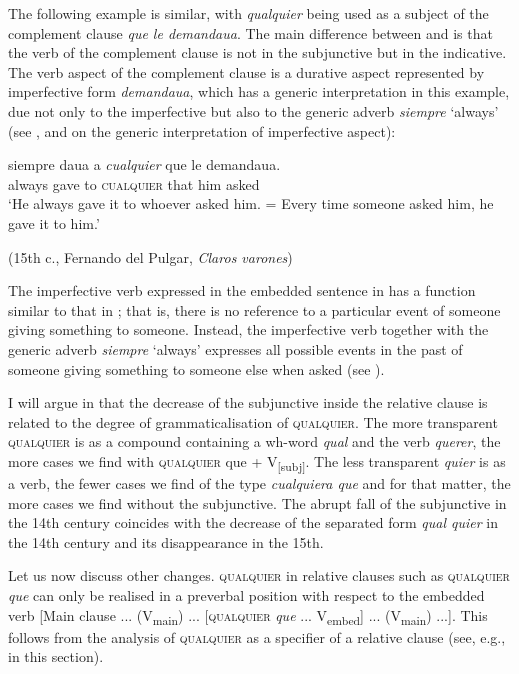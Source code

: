 The following example is similar, with \textit{qualquier} being used as a subject of the complement clause \textit{que le demandaua}. The main difference between  and  is that the verb of the complement clause is not in the subjunctive but in the indicative. The verb aspect of the complement clause is a durative aspect represented by imperfective form \textit{demandaua}, which has a generic interpretation in this example, due not only to the imperfective but also to the generic adverb \textit{siempre} ‘always’ (see \citealt{Quer2000}, and  on the generic interpretation of imperfective aspect):

\ea \label{ex:key:280}
  \gll siempre daua a \textit{cualquier} que le demandaua.\\
  always gave to \textsc{cualquier} that him asked\\
  \glt ‘He always gave it to whoever asked him. = Every time someone asked him, he gave it to him.’

  (15th c., Fernando del Pulgar, \textit{Claros varones})
\z

The imperfective verb expressed in the embedded sentence in  has a function similar to that in ; that is, there is no reference to a particular event of someone giving something to someone. Instead, the imperfective verb together with the generic adverb \textit{siempre} ‘always’ expresses all possible events in the past of someone giving something to someone else when asked (see \citealt{Becker2014}).

I will argue in  that the decrease of the subjunctive inside the relative clause is related to the degree of grammaticalisation of \textsc{qualquier}. The more transparent \textsc{qualquier} is as a compound containing a wh-word \textit{qual} and the verb \textit{querer}, the more cases we find with \textsc{qualquier} que + V\textsubscript{[subj]}. The less transparent \textit{quier} is as a verb, the fewer cases we find of the type \textit{cualquiera que} and for that matter, the more cases we find without the subjunctive. The abrupt fall of the subjunctive in the 14th century coincides with the decrease of the separated form \textit{qual quier} in the 14th century and its disappearance in the 15th.

Let us now discuss other changes. \textsc{qualquier} in relative clauses such as \textsc{qualquier} \textit{que} can only be realised in a preverbal position with respect to the embedded verb [Main clause ... (V\textsubscript{main}) ... [\textsc{qualquier} \textit{que} ... V\textsubscript{embed}] ... (V\textsubscript{main}) ...]. This follows from the analysis of \textsc{qualquier} as a specifier of a relative clause (see, e.g.,  in this section).

